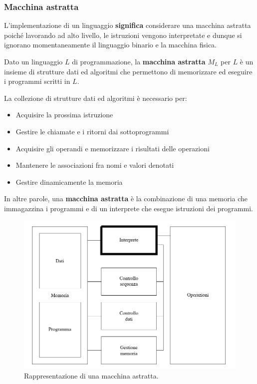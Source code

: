 \documentclass[a4paper]{article}
\begin{document}
	\subsubsection{Macchina astratta}

	\noindent
	L'implementazione di un linguaggio \textbf{significa} considerare una macchina astratta poiché lavorando ad alto livello, le istruzioni vengono interpretate e dunque si ignorano momentaneamente il linguaggio binario e la macchina fisica.\newline
	
	\noindent
	Dato un linguaggio $L$ di programmazione, la \textcolor{Red3}{\textbf{macchina astratta}} $M_{L}$ per $L$ è un insieme di strutture dati ed algoritmi che permettono di memorizzare ed eseguire i programmi scritti in $L$.\newpage
	
	\noindent
	La collezione di strutture dati ed algoritmi è necessario per:
	\begin{itemize}
		\item Acquisire la prossima istruzione
		
		\item Gestire le chiamate e i ritorni dai sottoprogrammi
		
		\item Acquisire gli operandi e memorizzare i risultati delle operazioni
		
		\item Mantenere le associazioni fra nomi e valori denotati
		
		\item Gestire dinamicamente la memoria
	\end{itemize}

	\noindent
	In altre parole, una \textbf{macchina astratta} è la combinazione di una memoria che immagazzina i programmi e di un interprete che esegue istruzioni dei programmi.
	\begin{figure}[!htp]
		\centering
		\includegraphics[width=\textwidth]{img/macchina_astratta.png}
		\caption{Rappresentazione di una macchina astratta.}
	\end{figure}
	
\end{document}
